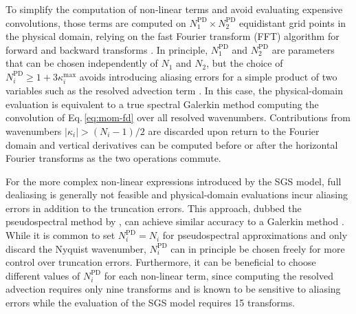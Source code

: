 \documentclass[gmd, manuscript]{copernicus}
\begin{document}
To simplify the computation of non-linear terms and avoid evaluating expensive convolutions, those terms are computed on \(N_1^\mathrm{PD} \times N_2^\mathrm{PD}\) equidistant grid points in the physical domain, relying on the fast Fourier transform (FFT) algorithm for forward and backward transforms \citep{Orszag1969, Orszag1971b}.
In principle, \(N_1^\mathrm{PD}\) and \(N_2^\mathrm{PD}\) are parameters that can be chosen independently of \(N_1\) and \(N_2\), but the choice of \(N_i^\mathrm{PD} \ge 1 + 3 \kappa_i^\mathrm{max}\) avoids introducing aliasing errors for a simple product of two variables such as the resolved advection term \citep{PattersonOrszag1971}.
In this case, the physical-domain evaluation is equivalent to a true spectral Galerkin method computing the convolution of Eq.\,\eqref{eq:mom-fd} over all resolved wavenumbers.
Contributions from wavenumbers \(\lvert \kappa_i \rvert > (N_i-1)/2\) are discarded upon return to the Fourier domain and vertical derivatives can be computed before or after the horizontal Fourier transforms as the two operations commute.

For the more complex non-linear expressions introduced by the SGS model, full dealiasing is generally not feasible and physical-domain evaluations incur aliasing errors in addition to the truncation errors.
This approach, dubbed the pseudospectral method by \citet{Orszag1971b}, can achieve similar accuracy to a Galerkin method \citep{Orszag1972}.
While it is common to set \(N_i^\mathrm{PD} = N_i\) for pseudospectral approximations and only discard the Nyquist wavenumber, \(N_i^\mathrm{PD}\) can in principle be chosen freely for more control over truncation errors.
Furthermore, it can be beneficial to choose different values of \(N_i^\mathrm{PD}\) for each non-linear term, since computing the resolved advection requires only nine transforms and is known to be sensitive to aliasing errors \citep{KravchenkoMoin1997, Margairaz+2018} while the evaluation of the SGS model requires 15 transforms.
\end{document}
